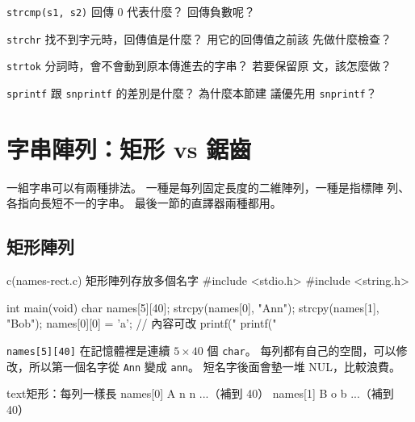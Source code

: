 

\begin{drills}[label=drills:str-stdlib]
\item \texttt{strcmp(s1, s2)} 回傳 $0$ 代表什麼？ 回傳負數呢？
\item \texttt{strchr} 找不到字元時，回傳值是什麼？ 用它的回傳值之前該
先做什麼檢查？
\item \texttt{strtok} 分詞時，會不會動到原本傳進去的字串？ 若要保留原
文，該怎麼做？
\item \texttt{sprintf} 跟 \texttt{snprintf} 的差別是什麼？ 為什麼本節建
議優先用 \texttt{snprintf}？
\end{drills}

\section{字串陣列：矩形 vs 鋸齒}
\label{sec:str-array-rect-jagged}

一組字串可以有兩種排法。 一種是每列固定長度的二維陣列，一種是指標陣
列、各指向長短不一的字串。 最後一節的直譯器兩種都用。

\subsection{矩形陣列}

\begin{example}{c}{(names-rect.c) 矩形陣列存放多個名字}
#include <stdio.h>
#include <string.h>

int main(void) {
    char names[5][40];
    strcpy(names[0], "Ann");
    strcpy(names[1], "Bob");
    names[0][0] = 'a';     // 內容可改
    printf("%
    printf("%
}
\end{example}


\texttt{names[5][40]} 在記憶體裡是連續 $5 \times 40$ 個
\texttt{char}。 每列都有自己的空間，可以修改，所以第一個名字從
\texttt{Ann} 變成 \texttt{ann}。 短名字後面會墊一堆 NUL，比較浪費。

\begin{code}{text}{矩形：每列一樣長}
names[0]  A n n \0  ...（補到 40）
names[1]  B o b \0  ...（補到 40）
\end{code}

